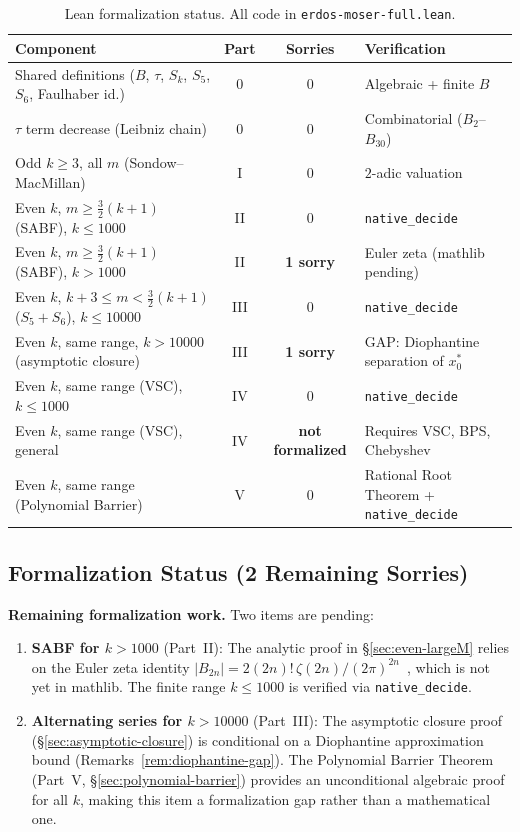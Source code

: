 \documentclass[12pt,a4paper]{article}
\theoremstyle{plain}
\theoremstyle{definition}
\begin{document}
\begin{table}[htbp]
\centering
\caption{Lean formalization status.  All code in \texttt{erdos-moser-full.lean}.}
\label{tab:lean-status}
\begin{tabularx}{\linewidth}{@{}L c c L@{}}
\toprule
\textbf{Component} & \textbf{Part} & \textbf{Sorries} & \textbf{Verification} \\
\midrule
Shared definitions ($B$, $\tau$, $S_k$, $S_5$, $S_6$, Faulhaber id.) & 0 & 0 & Algebraic + finite $B$ \\
$\tau$ term decrease (Leibniz chain) & 0 & 0 & Combinatorial ($B_2$--$B_{30}$) \\
\midrule
Odd $k \ge 3$, all $m$ (Sondow--MacMillan) & I & 0 & $2$-adic valuation \\
\midrule
Even $k$, $m \ge \frac{3}{2}(k+1)$ (SABF), $k \le 1000$ & II & 0 & \texttt{native\_decide} \\
Even $k$, $m \ge \frac{3}{2}(k+1)$ (SABF), $k > 1000$ & II & \textbf{1 sorry} & Euler zeta (mathlib pending) \\
\midrule
Even $k$, $k+3 \le m < \frac{3}{2}(k+1)$ ($S_5+S_6$), $k \le 10000$ & III & 0 & \texttt{native\_decide} \\
Even $k$, same range, $k > 10000$ (asymptotic closure) & III & \textbf{1 sorry} & GAP: Diophantine separation of $x_0^*$ \\
\midrule
Even $k$, same range (VSC), $k \le 1000$ & IV & 0 & \texttt{native\_decide} \\
Even $k$, same range (VSC), general & IV & \textbf{not formalized} & Requires VSC, BPS, Chebyshev \\
\midrule
Even $k$, same range (Polynomial Barrier) & V & 0 & Rational Root Theorem + \texttt{native\_decide} \\
\bottomrule
\end{tabularx}
\end{table}

\subsection{Formalization Status (2 Remaining Sorries)}
\label{sec:lean-status}

\noindent\textbf{Remaining formalization work.}
Two items are pending:
\begin{enumerate}[nosep]
  \item \textbf{SABF for $k > 1000$} (Part~II): The analytic proof in
    \S\ref{sec:even-largeM} relies on the Euler zeta identity
    $|B_{2n}| = 2(2n)!\,\zeta(2n)/(2\pi)^{2n}$~\cite{Euler}, which
    is not yet in mathlib.  The finite range $k \le 1000$ is verified
    via \texttt{native\_decide}.
  \item \textbf{Alternating series for $k > 10000$} (Part~III): The
    asymptotic closure proof (\S\ref{sec:asymptotic-closure}) is
    conditional on a Diophantine approximation bound
    (Remarks~\ref{rem:diophantine-gap}).  The Polynomial Barrier Theorem
    (Part~V, \S\ref{sec:polynomial-barrier}) provides an unconditional
    algebraic proof for all $k$, making this item a formalization gap
    rather than a mathematical one.
\end{enumerate}
\end{document}
